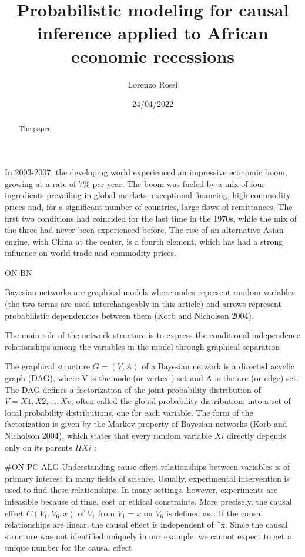 \documentclass[
]{article}
\title{Probabilistic modeling for causal inference applied to African
economic recessions}
\author{Lorenzo Rossi}
\date{24/04/2022}
\begin{document}
\maketitle
\begin{abstract}
The paper
\end{abstract}

In 2003-2007, the developing world experienced an impressive economic
boom, growing at a rate of 7\% per year. The boom was fueled by a mix of
four ingredients prevailing in global markets: exceptional financing,
high commodity prices and, for a significant number of countries, large
flows of remittances. The first two conditions had coincided for the
last time in the 1970s, while the mix of the three had never been
experienced before. The rise of an alternative Asian engine, with China
at the center, is a fourth element, which has had a strong influence on
world trade and commodity prices.

ON BN

Bayesian networks are graphical models where nodes represent random
variables (the two terms are used interchangeably in this article) and
arrows represent probabilistic dependencies between them (Korb and
Nicholson 2004).

The main role of the network structure is to express the conditional
independence relationships among the variables in the model through
graphical separation

The graphical structure \(G = (V, A)\) of a Bayesian network is a
directed acyclic graph (DAG), where V is the node (or vertex ) set and A
is the arc (or edge) set. The DAG defines a factorization of the joint
probability distribution of \(V = {X1, X2, . . . , Xv}\), often called
the global probability distribution, into a set of local probability
distributions, one for each variable. The form of the factorization is
given by the Markov property of Bayesian networks (Korb and Nicholson
2004), which states that every random variable \(Xi\) directly depends
only on its parents \(ΠXi\) :

\#ON PC ALG Understanding cause-effect relationships between variables
is of primary interest in many fields of science. Usually, experimental
intervention is used to find these relationships. In many settings,
however, experiments are infeasible because of time, cost or ethical
constraints. More precisely, the causal effect \(C(V_1, V_6, x)\) of
\(V_1\) from \(V_1 = x\) on \(V_6\) is defined as\ldots{} If the causal
relationships are linear, the causal effect is independent of ˜x. Since
the causal structure was not identified uniquely in our example, we
cannot expect to get a unique number for the causal effect
\end{document}
